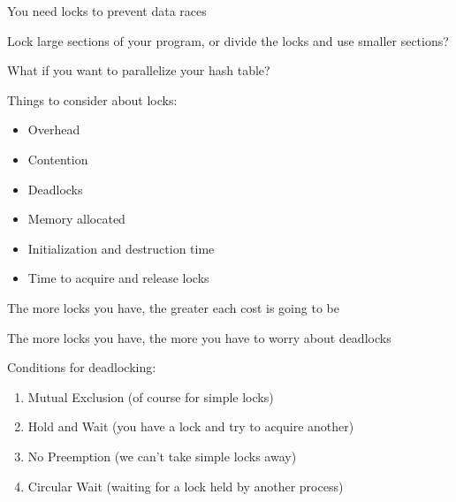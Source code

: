   \begin{slide}


    You need locks to prevent data races
    \medskip

    Lock large sections of your program, or divide the locks and
    use smaller sections?

    \leftspace{}What if you want to parallelize your hash table?
    \medskip
    
    Things to consider about locks:
    \begin{itemize}
     \item Overhead
      \item Contention
      \item Deadlocks
    \end{itemize}

  \end{slide}

  \begin{slide}


    \begin{itemize}
      \item Memory allocated
      \item Initialization and destruction time
      \item Time to acquire and release locks
    \end{itemize}

    The more locks you have, the greater each cost is going to be

  \end{slide}

  \begin{slide}


    The more locks you have, the more you have to worry about deadlocks
    \medskip

    Conditions for deadlocking:

    \begin{enumerate}
      \item Mutual Exclusion (of course for simple locks)
      \item Hold and Wait (you have a lock and try to acquire another)
      \item No Preemption (we can't take simple locks away)
      \item Circular Wait (waiting for a lock held by another process)
    \end{enumerate}

  \end{slide}

